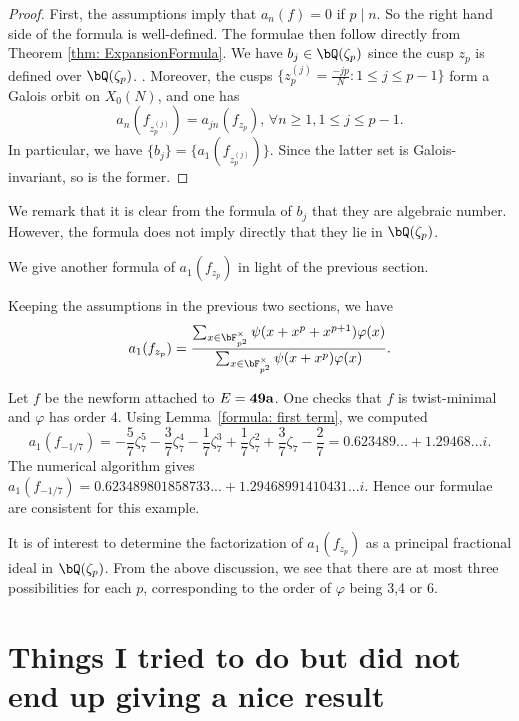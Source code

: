 \documentclass [11pt, proquest] {uwthesis}[2015/03/03]
\begin{document}
\begin{proof}
First, the assumptions imply that $a_{n}(f) =  0$ if $p \mid n$. So the right hand side of the formula is well-defined. 
The formulae then follow directly from Theorem \ref{thm: ExpansionFormula}.   We have $b_j \in \bQ(\zeta_p)$ since the cusp $z_p$ is defined over $\bQ(\zeta_p)$. . Moreover, the cusps $\{z_p^{(j)} = \frac{-jp}{N}: 1 \leq j \leq p-1\}$ form a Galois orbit on $X_0(N)$, and one has 
\[
	a_n(f_{z_p^{(j)}}) = a_{jn}(f_{z_p}), \, \forall n \geq 1, 1 \leq j \leq p-1. 
\]
In particular, we have $\{b_j\} = \{a_1(f_{z_p^{(j)}})\}$. Since the latter set is Galois-invariant, so is the former. 
\end{proof}

We remark that it is clear from the formula of $b_j$ that they are algebraic number. However, the formula does not imply directly that they lie in $\bQ(\zeta_p)$. 

We give another formula of $a_1(f_{z_p})$ in light of the previous section. 

\begin{Lemma} \label{formula: first term}
Keeping the assumptions in the previous two sections, we have 
$$a_1(f_{z_p}) = \frac{\sum_{x \in \bF_{p^2}^{\times}} \psi(x+x^p+x^{p+1}) \varphi(x)}{\sum_{x \in \bF_{p^2}^{\times} }\psi(x+x^p) \varphi(x)}. $$
\end{Lemma}

\begin{Example}
Let $f$ be the newform attached to $E  =\bf{49a}$. One checks that $f$ is twist-minimal and $\varphi$ has order 4. Using Lemma~\ref{formula: first term}, we computed $$a_1(f_{-1/7}) = -\frac{5}{7} \zeta_{7}^{5} - \frac{3}{7} \zeta_{7}^{4} - \frac{1}{7} \zeta_{7}^{3} + \frac{1}{7} \zeta_{7}^{2} + \frac{3}{7} \zeta_{7} - \frac{2}{7} = 0.623489... + 1.29468...i. $$
The numerical algorithm gives $a_1(f_{-1/7}) = 0.623489801858733...+ 1.29468991410431...i$. Hence our formulae are 
consistent for this example.
\end{Example}


It is of interest to determine the factorization of $a_1(f_{z_p})$ as a principal fractional ideal in $\bQ(\zeta_p)$. From the 
above discussion, we see that there are at most three possibilities for each $p$, corresponding to the order of $\varphi$ being 3,4 or 6.


\chapter{Things I tried to do but did not end up giving a nice result}
\end{document}
